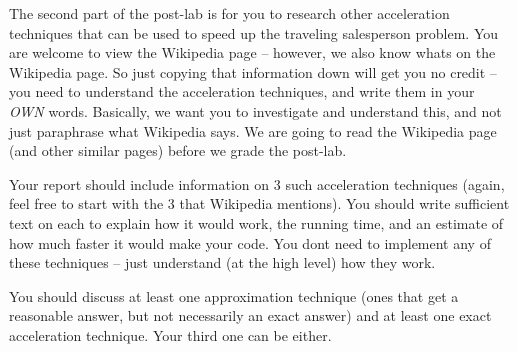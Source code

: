 The second part of the post-\/lab is for you to research other acceleration techniques that can be used to speed up the traveling salesperson problem. You are welcome to view the Wikipedia page -- however, we also know what\textquotesingle{}s on the Wikipedia page. So just copying that information down will get you no credit -- you need to understand the acceleration techniques, and write them in your {\itshape O\+WN} words. Basically, we want you to investigate and understand this, and not just paraphrase what Wikipedia says. We are going to read the Wikipedia page (and other similar pages) before we grade the post-\/lab.

Your report should include information on 3 such acceleration techniques (again, feel free to start with the 3 that Wikipedia mentions). You should write sufficient text on each to explain how it would work, the running time, and an estimate of how much faster it would make your code. You don\textquotesingle{}t need to implement any of these techniques -- just understand (at the high level) how they work.

You should discuss at least one approximation technique (ones that get a reasonable answer, but not necessarily an exact answer) and at least one exact acceleration technique. Your third one can be either. 